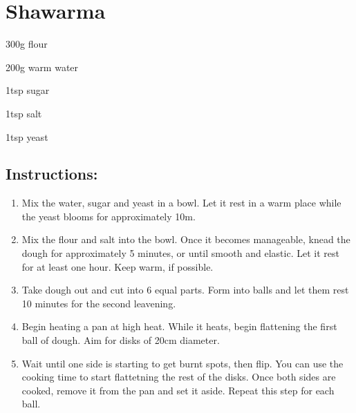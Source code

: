 \section{Shawarma}

\begin{ingredients}
	\item 300g flour
	\item 200g warm water
	\item 1tsp sugar
	\item 1tsp salt
	\item 1tsp yeast
\end{ingredients}

\subsection{Instructions:}
\begin{enumerate}
	\item Mix the water, sugar and yeast in a bowl. Let it rest in a warm place while the yeast blooms for approximately 10m.
	\item Mix the flour and salt into the bowl. Once it becomes manageable, knead the dough for approximately 5 minutes, or until smooth and elastic. Let it rest for at least one hour. Keep warm, if possible.
	\item Take dough out and cut into 6 equal parts. Form into balls and let them rest 10 minutes for the second leavening.
	\item Begin heating a pan at high heat. While it heats, begin flattening the first ball of dough. Aim for disks of 20cm diameter.
	\item Wait until one side is starting to get burnt spots, then flip. You can use the cooking time to start flattetning the rest of the disks. Once both sides are cooked, remove it from the pan and set it aside. Repeat this step for each ball.
\end{enumerate}

